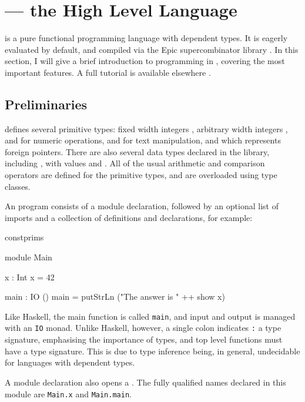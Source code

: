 \section{\Idris{} --- the High Level Language}

\label{sect:hll}

\Idris{} is
a pure functional programming language with dependent types. It is
eagerly evaluated by default, and compiled via the Epic supercombinator
library \cite{brady2011epic}.
In this section, I will give a brief introduction to programming in \Idris{},
covering the most important features. A full tutorial is available elsewhere
\cite{idristutorial}. 

\subsection{Preliminaries}

\Idris{} defines several primitive types: fixed width integers
, arbitrary width integers , and
 for numeric operations,  and  for
text manipulation, and  which represents foreign pointers.
There are also several data types declared in the library, including
, with values  and . All of the usual
arithmetic and comparison operators are defined for the primitive types,
and are overloaded using type classes.

An \Idris{} program consists of a module declaration, followed by an optional
list of imports and a collection of definitions and declarations, for example:

\begin{SaveVerbatim}{constprims}

module Main

x : Int
x = 42

main : IO ()
main = putStrLn ("The answer is " ++ show x)

\end{SaveVerbatim}

\noindent
Like Haskell, the main function
is called \texttt{main}, and input and output is managed with an \texttt{IO}
monad. Unlike Haskell, however, a single colon indicates \texttt{:} a type
signature, emphasising the importance of types, 
and  top level functions must have a type
signature. This is due to type inference being, in general, 
undecidable for languages with
dependent types.

A module declaration also opens a . The fully qualified names
declared in this module are \texttt{Main.x} and \texttt{Main.main}.


